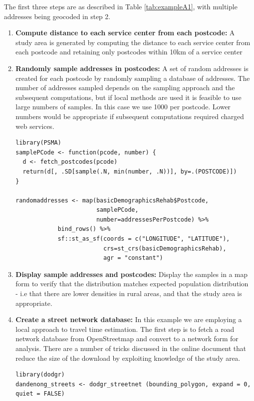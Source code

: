 \documentclass[utf8]{frontiersHLTH}
\begin{document}
\clearpage

\begin{table}[h]
\begin{center}
  \sffamily
  \tiny
\begin{mdframed}[backgroundcolor=blue!20]
The first three steps are as described in Table \ref{tab:exampleA1},
with multiple addresses being geocoded in step 2.
\begin{enumerate}
  \def\labelenumi{\arabic{enumi}.}
  \setcounter{enumi}{3}
\item
  {\bf Compute distance to each service center from each postcode:} A study
  area is generated by computing the distance to each service center
  from each postcode and retaining only postcodes within 10km of a
  service center
\item
 {\bf Randomly sample addresses in postcodes:} A set of random addresses is created for each
  postcode by randomly sampling a database of addresses. The number of
  addresses sampled depends on the sampling approach and the subsequent
  computations, but if local methods are used it is feasible to use
  large numbers of samples. In this case we use 1000 per postcode. Lower
  numbers would be appropriate if subsequent computations required
  charged web services.

\begin{lstlisting}
library(PSMA)
samplePCode <- function(pcode, number) {
  d <- fetch_postcodes(pcode)
  return(d[, .SD[sample(.N, min(number, .N))], by=.(POSTCODE)])
}

randomaddresses <- map(basicDemographicsRehab$Postcode,
                       samplePCode,
                       number=addressesPerPostcode) %>%
            bind_rows() %>%
            sf::st_as_sf(coords = c("LONGITUDE", "LATITUDE"),
                         crs=st_crs(basicDemographicsRehab),
                         agr = "constant")
\end{lstlisting}

\item
  {\bf Display sample addresses and postcodes:} Display the samples in a map
  form to verify that the distribution matches expected population
  distribution - i.e that there are lower densities in rural areas, and
  that the study area is appropriate.
\item
  {\bf Create a street network database:} In this example we are employing a
  local approach to travel time estimation. The first step is to fetch a
  road network database from OpenStreetmap and convert to a network form
  for analysis. There are a number of tricks discussed in the online
  document that reduce the size of the download by exploiting knowledge
  of the study area.
\begin{lstlisting}
library(dodgr)
dandenong_streets <- dodgr_streetnet (bounding_polygon, expand = 0, quiet = FALSE)
\end{lstlisting}


\end{enumerate}
\end{mdframed}
\end{center}
\end{table}
\end{document}
